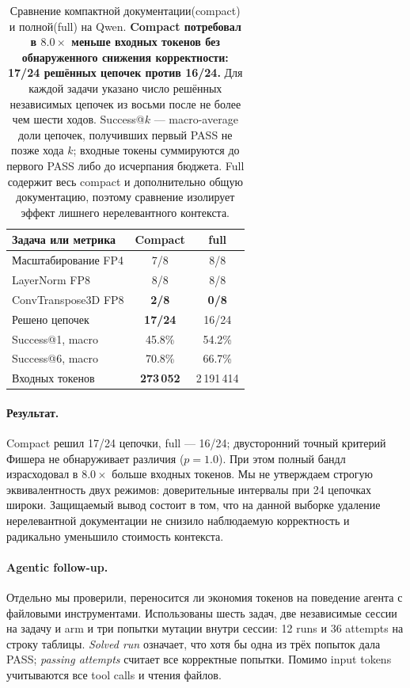 \documentclass[10pt,a4paper]{article}
\begin{document}
\begin{table}[h]
\centering\footnotesize
\caption{Сравнение компактной документации(compact) и полной(full) на Qwen. \textbf{Compact потребовал в $8.0\times$ меньше входных токенов без обнаруженного снижения корректности: 17/24 решённых цепочек против 16/24.} Для каждой задачи указано число решённых независимых цепочек из восьми после не более чем шести ходов. Success@$k$ --- macro-average доли цепочек, получивших первый PASS не позже хода $k$; входные токены суммируются до первого PASS либо до исчерпания бюджета. Full содержит весь compact и дополнительно общую документацию, поэтому сравнение изолирует эффект лишнего нерелевантного контекста.}
\label{tab:compact-strict}
\begin{tabular}{lcc}
\toprule
Задача или метрика & Compact & full \\
\midrule
Масштабирование FP4      & 7/8  & 8/8 \\
LayerNorm FP8            & 8/8  & 8/8 \\
ConvTranspose3D FP8      & \textbf{2/8}  & \textbf{0/8} \\
\midrule
Решено цепочек           & \textbf{17/24} & 16/24 \\
Success@1, macro         & 45.8\% & 54.2\% \\
Success@6, macro         & 70.8\% & 66.7\% \\
Входных токенов          & \textbf{273\,052} & 2\,191\,414 \\
\bottomrule
\end{tabular}
\end{table}

\paragraph{Результат.}
Compact решил 17/24 цепочки, full --- 16/24; двусторонний точный
критерий Фишера не обнаруживает различия ($p=1.0$). При этом полный бандл
израсходовал в $8.0\times$ больше входных токенов. Мы не утверждаем строгую
эквивалентность двух режимов: доверительные интервалы при 24 цепочках широки.
Защищаемый вывод состоит в том, что на данной выборке удаление нерелевантной
документации не снизило наблюдаемую корректность и радикально уменьшило
стоимость контекста.

\paragraph{Agentic follow-up.}
Отдельно мы проверили, переносится ли экономия токенов на поведение агента с
файловыми инструментами. Использованы шесть задач, две независимые сессии на
задачу и arm и три попытки мутации внутри сессии: 12 runs и 36 attempts на
строку таблицы. \emph{Solved run} означает, что хотя бы одна из трёх попыток
дала PASS; \emph{passing attempts} считает все корректные попытки. Помимо
input tokens учитываются все tool calls и чтения файлов.
\end{document}
